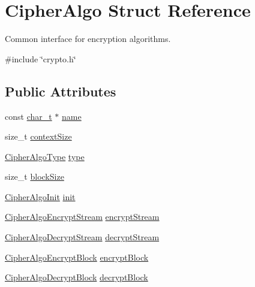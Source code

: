 \hypertarget{structCipherAlgo}{}\section{Cipher\+Algo Struct Reference}
\label{structCipherAlgo}


Common interface for encryption algorithms.  




{\ttfamily \#include \char`\"{}crypto.\+h\char`\"{}}

\subsection*{Public Attributes}
\begin{DoxyCompactItemize}
\item 
const \hyperlink{compiler__port_8h_a40bb5262bf908c328fbcfbe5d29d0201}{char\+\_\+t} $\ast$ \hyperlink{structCipherAlgo_ab0420cb1d17679c994059ddfd73df6ee}{name}
\item 
size\+\_\+t \hyperlink{structCipherAlgo_a79c74860795d2bf2ef6bff7885a33666}{context\+Size}
\item 
\hyperlink{cyclone__crypto_2core_2crypto_8h_ae03a6c8f32ed798857924d908aacc49b}{Cipher\+Algo\+Type} \hyperlink{structCipherAlgo_a840c614fa1ae0f98a9350bc4f040dc7a}{type}
\item 
size\+\_\+t \hyperlink{structCipherAlgo_a1f318963e641736f3c5836274ef758f1}{block\+Size}
\item 
\hyperlink{cyclone__crypto_2core_2crypto_8h_a1a0f02cdb8a3295caa1b87db2785e678}{Cipher\+Algo\+Init} \hyperlink{structCipherAlgo_a5c1fa3eb89f3d31f01c2c501b94fdd79}{init}
\item 
\hyperlink{cyclone__crypto_2core_2crypto_8h_aae77a823e0d715f38ce07aa1966dd8f5}{Cipher\+Algo\+Encrypt\+Stream} \hyperlink{structCipherAlgo_a158602146ec9ac4f5eb3540e603b0a44}{encrypt\+Stream}
\item 
\hyperlink{cyclone__crypto_2core_2crypto_8h_aafba7bbaaf58a20e4766a30f2d14fc7f}{Cipher\+Algo\+Decrypt\+Stream} \hyperlink{structCipherAlgo_a20a406bd117ecab1e3b5a9d23f5deee2}{decrypt\+Stream}
\item 
\hyperlink{cyclone__crypto_2core_2crypto_8h_a4b511302b7e4f6ff51dd72f5abde7077}{Cipher\+Algo\+Encrypt\+Block} \hyperlink{structCipherAlgo_a61360848127c17c27fe5304588f7f211}{encrypt\+Block}
\item 
\hyperlink{cyclone__crypto_2core_2crypto_8h_a15510227bd1c7721d1e3af2480069990}{Cipher\+Algo\+Decrypt\+Block} \hyperlink{structCipherAlgo_a3023886b85aca88688456ed460a8576d}{decrypt\+Block}
\end{DoxyCompactItemize}


